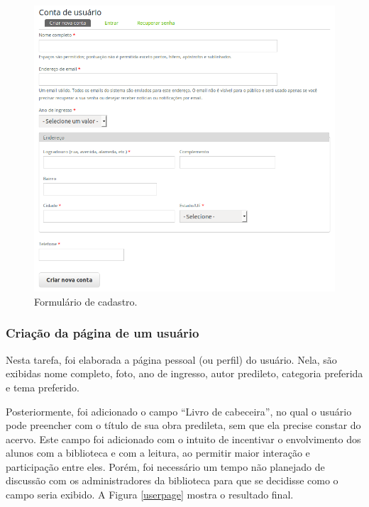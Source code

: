 \documentclass[a4paper]{article}
\begin{document}
\begin{figure}[pbth!]
\centering
\caption{Formulário de cadastro.\label{cadastro}}
\includegraphics[width=140mm]{img/newuser.png}
\end{figure}

\subsubsection{Criação da página de um usuário}

Nesta tarefa, foi elaborada a página pessoal (ou perfil) do usuário. Nela, são exibidas nome completo, foto, ano de ingresso, autor predileto, categoria preferida e tema preferido.

Posteriormente, foi adicionado o campo “Livro de cabeceira”, no qual o usuário pode preencher com o título de sua obra predileta, sem que ela precise constar do acervo. Este campo foi adicionado com o intuito de incentivar o envolvimento dos alunos com a biblioteca e com a leitura, ao permitir maior interação e participação entre eles. Porém, foi necessário um tempo não planejado de discussão com os administradores da biblioteca para que se decidisse como o campo seria exibido. A Figura \ref{userpage} mostra o resultado final.
\end{document}
